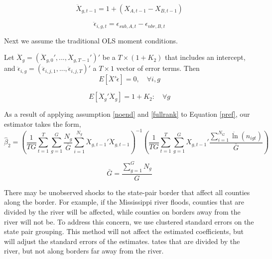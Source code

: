 \begin{equation}
\ddot X_{g,t-1} = 1+(X_{A,t-1}-X_{B,t-1})
\end{equation}

\begin{equation}
\ddot \epsilon_{i,g,t} = \epsilon_{sub,A,t}-\epsilon_{nbr,B,t}
\end{equation}

Next we assume the traditional OLS moment conditions.

\begin{assumption}\label{noend}
Let  $\ddot X_{g} = (\ddot X_{g,0}', ... ,\ddot X_{g,T-1}')'$ be a $T \times (1+K_{2})$ that includes an intercept, and $\ddot \epsilon_{i,g} = (\ddot\epsilon_{i,j,1},...,\ddot\epsilon_{i,j,T})'$ a $T \times 1$ vector of error terms. Then 
\begin{equation}E[\ddot X'\ddot \epsilon] = 0, \quad \forall i,g\end{equation}
\end{assumption}

\begin{assumption}\label{fullrank}
 \begin{equation}E[\ddot X_{g}'\ddot X_{g}] = 1+K_{2}: \quad \forall g\end{equation}
\end{assumption}

As a result of applying assumption \ref{noend} and \ref{fullrank} to Equation \ref{pref}, our estimator takes the form,
\begin{equation}\label{pols_2s}
\hat \beta_{2} = \left(\frac{1}{TG} \sum_{t=1}^{T}\sum_{g=1}^{G}\frac{N_{g}}{\bar G}\sum_{i=1}^{N_{g}}\ddot X_{g,t-1}'\ddot X_{g,t-1}\right)^{-1}\left(\frac{1}{TG}\sum_{t=1}^{T}\sum_{g=1}^{G}X_{g,t-1}'\frac{\sum_{i=1}^{N_{G}}\ddot \ln(n_{igt})}{\bar G}\right)
\end{equation}

\begin{equation}
\bar G = \frac{\sum_{g=1}^{G}N_{g}}{G}
\end{equation}

There may be unobserved shocks to the state-pair border that affect all counties along the border.  For example, if the Mississippi river floods, counties that are divided by the river will be affected, while counties on borders away from the river will not be. To address this concern, we use clustered standard errors on the state pair grouping.  This method will not affect the estimated coefficients, but will adjust the standard errors of the estimates. tates that are divided by the river, but not along borders far away from the river.

